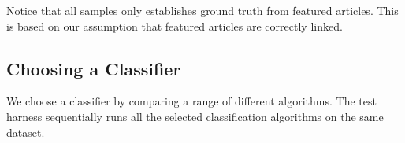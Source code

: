 Notice that all samples only establishes ground truth from featured articles. This is based on our assumption that featured articles are correctly linked.

\subsection{Choosing a Classifier}
We choose a classifier by comparing a range of different algorithms. The test harness sequentially runs all the selected classification algorithms on the same dataset.


